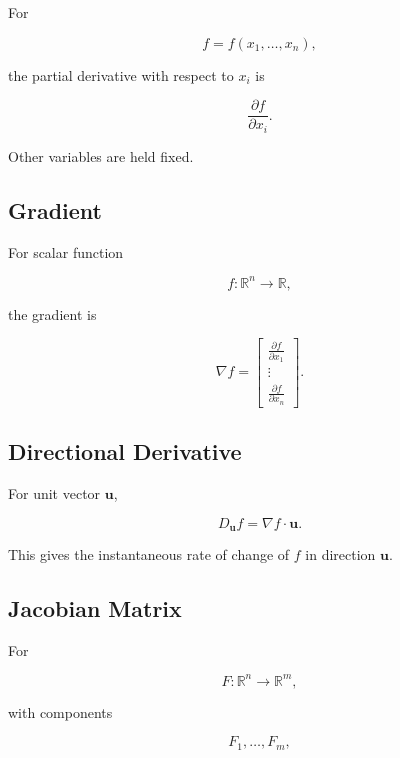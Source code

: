 For

\[
f=f(x_1,\ldots,x_n),
\]

the partial derivative with respect to \(x_i\) is

\[
\boxed{
\frac{\partial f}{\partial x_i}.
}
\]

Other variables are held fixed.

\subsection{Gradient}
\label{subsec:gradient-derivative-table}

For scalar function

\[
f:\mathbb{R}^n\to\mathbb{R},
\]

the gradient is

\[
\boxed{
\nabla f
=
\begin{bmatrix}
\frac{\partial f}{\partial x_1}\\
\vdots\\
\frac{\partial f}{\partial x_n}
\end{bmatrix}.
}
\]

\subsection{Directional Derivative}
\label{subsec:directional-derivative-reference}

For unit vector \(\mathbf{u}\),

\[
\boxed{
D_{\mathbf{u}}f
=
\nabla f\cdot\mathbf{u}.
}
\]

This gives the instantaneous rate of change of \(f\) in direction
\(\mathbf{u}\).

\subsection{Jacobian Matrix}
\label{subsec:jacobian-derivative-reference}

For

\[
F:\mathbb{R}^n\to\mathbb{R}^m,
\]

with components

\[
F_1,\ldots,F_m,
\]

